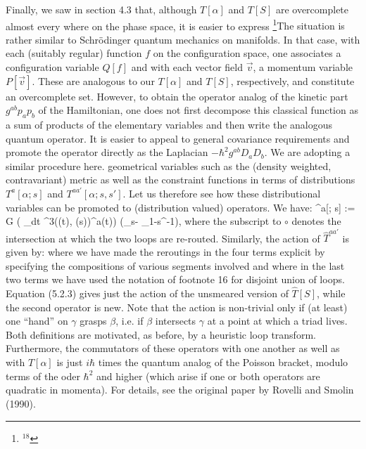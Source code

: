 Finally, we saw in section 4.3 that, although  $T[\alpha]$ and $T[S]$ are
overcomplete almost every where on the phase space, it is easier to express%
\footnote{$^{18}$}{The situation is rather similar to Schr\"odinger quantum
mechanics on manifolds. In that case, with each (suitably regular) function
$f$ on the configuration space, one associates a configuration variable
$Q[f]$ and with each vector field $\vec v$, a momentum variable $P[\vec v]$.
These are analogous to our $T[\alpha]$ and $T[S]$, respectively, and constitute
an overcomplete set. However, to obtain the operator analog of the kinetic
part $g^{ab}p_ap_b$ of the Hamiltonian, one does not first decompose this
classical function as a sum of products of the elementary variables and then
write the analogous quantum operator. It is easier to appeal to general
covariance requirements and promote the operator directly as the Laplacian
$-\hbar^2 g^{ab}D_a D_b$. We are adopting a similar procedure here.}%
geometrical variables such as the (density weighted, contravariant) metric
as well as the constraint functions in terms of
distributions $T^a[\alpha; s]$ and $T^{aa'}[\alpha; s,s']$. Let us therefore
see how these distributional variables can be promoted to (distribution
valued) operators. We have:
\bneq
\langle\beta\mid \circ {}^a[\gamma; s] := {\hbar G} \big(
\oint_\beta dt \delta^3(\beta(t), \gamma(s))\dot\beta^a(t)\big)\-\cdot\-
\big(\langle\beta\circ_s\gamma\mid -
\langle \beta\circ_{1-s}\gamma^{-1}\mid \big),
where the subscript to $\circ$ denotes the intersection at which the two
loops are re-routed. Similarly, the action of $\hat{T}^{aa'}$ is given by:
where we have made the reroutings in the four terms explicit by specifying
the compositions of various segments involved and where in the last two terms
we have used the notation of footnote 16 for disjoint union of loops.
Equation (5.2.3) gives just the action of the unsmeared version
of $\hat{T}[S]$, while the second operator is new. Note that the action is
non-trivial only if (at least) one ``hand'' on $\gamma$ grasps $\beta$, i.e.
if $\beta$ intersects $\gamma$ at a point at which a triad lives. Both
definitions  are motivated, as before, by a heuristic loop transform.
Furthermore, the commutators of these operators with one another as well as
with $\hat{T}[\alpha ]$ is just $i\hbar$ times the quantum analog of the
Poisson bracket, modulo terms of the oder $\hbar^2$ and higher (which arise
if one or both operators are quadratic in momenta). For details, see the
original paper by Rovelli and Smolin (1990).

